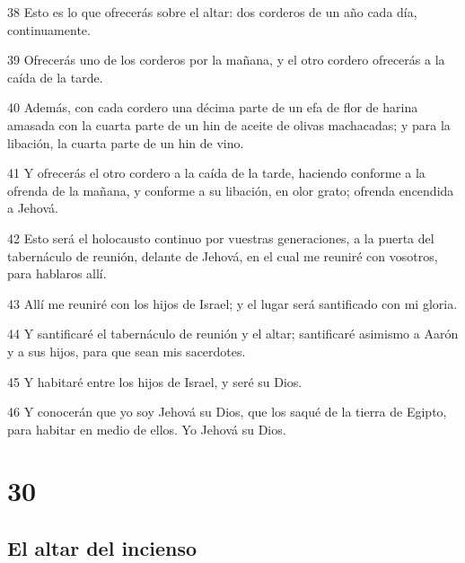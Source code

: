 \par 38 Esto es lo que ofrecerás sobre el altar: dos corderos de un año cada día, continuamente.
\par 39 Ofrecerás uno de los corderos por la mañana, y el otro cordero ofrecerás a la caída de la tarde.
\par 40 Además, con cada cordero una décima parte de un efa   de flor de harina amasada con la cuarta parte de un hin de aceite de olivas machacadas; y para la libación, la cuarta parte de un hin de vino.
\par 41 Y ofrecerás el otro cordero a la caída de la tarde, haciendo conforme a la ofrenda de la mañana, y conforme a su libación, en olor grato; ofrenda encendida a Jehová.
\par 42 Esto será el holocausto continuo por vuestras generaciones, a la puerta del tabernáculo de reunión, delante de Jehová, en el cual me reuniré con vosotros, para hablaros allí.
\par 43 Allí me reuniré con los hijos de Israel; y el lugar será santificado con mi gloria.
\par 44 Y santificaré el tabernáculo de reunión y el altar; santificaré asimismo a Aarón y a sus hijos, para que sean mis sacerdotes.
\par 45 Y habitaré entre los hijos de Israel, y seré su Dios.
\par 46 Y conocerán que yo soy Jehová su Dios, que los saqué de la tierra de Egipto, para habitar en medio de ellos. Yo Jehová su Dios.

\chapter{30}

\section*{El altar del incienso}

